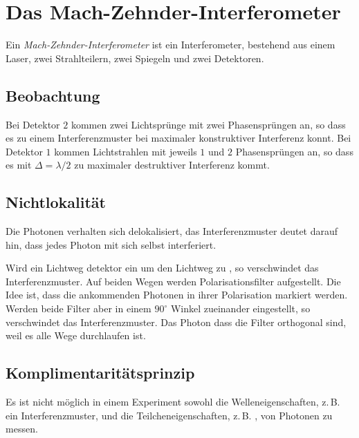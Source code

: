 \documentclass{article}
\begin{document}
\section{Das Mach-Zehnder-Interferometer}
Ein \emph{Mach-Zehnder-Interferometer} ist ein Interferometer, bestehend aus einem Laser, zwei Strahlteilern, zwei Spiegeln und zwei Detektoren.
 
\subsection{Beobachtung} 
Bei Detektor $2$ kommen zwei Lichtsprünge mit zwei Phasensprüngen an, so dass es zu einem Interferenzmuster bei maximaler konstruktiver Interferenz konnt. Bei Detektor $1$ kommen Lichtstrahlen mit jeweils $1$ und $2$ Phasensprüngen an, so dass es mit $\Delta = \lambda / 2$ zu maximaler destruktiver Interferenz kommt.
 
\subsection{Nichtlokalität} 
Die Photonen verhalten sich delokalisiert, das Interferenzmuster deutet darauf hin, dass jedes Photon mit sich selbst interferiert.
  
Wird ein Lichtweg detektor ein um den Lichtweg zu , so verschwindet das Interferenzmuster. Auf beiden Wegen werden Polarisationsfilter aufgestellt. Die Idee ist, dass die ankommenden Photonen in ihrer Polarisation markiert werden. Werden beide Filter aber in einem $90^\circ$ Winkel zueinander eingestellt, so verschwindet das Interferenzmuster. Das Photon  dass die Filter orthogonal sind, weil es alle Wege durchlaufen ist.
 
\subsection{Komplimentaritätsprinzip}
Es ist nicht möglich in einem Experiment sowohl die Welleneigenschaften, z.\,B. ein Interferenzmuster, und die Teilcheneigenschaften, z.\,B. , von Photonen zu messen.
\end{document}

